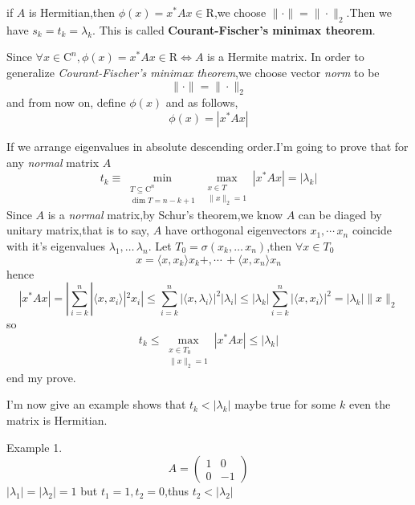 \documentclass[a4paper,12pt]{article}
\begin{document}
if $A$ is Hermitian,then $\phi(x)=x^*Ax \in \mathrm{R}$,we choose $\|\cdot\|=\|\cdot\|_2$.Then we have $s_k = t_k = \lambda_k $. This is called \textbf{Courant-Fischer's minimax theorem}.

Since $\forall x \in \mathrm{C}^n, \phi(x)=x^*Ax \in \mathrm{R} \iff A $ is a Hermite matrix.\newline
In order to generalize \textit{Courant-Fischer's minimax theorem},we choose vector \textit{norm} to be \[ \|\cdot\|=\|\cdot\|_2 \] and from now on, define $\phi(x)$ and as follows,
\[ \phi(x)=|x^*Ax| \]

If we arrange eigenvalues in absolute descending order.I'm going to prove that for any \textit{normal} matrix $A$
\[ t_k \equiv
\min_{\begin{matrix} T \subseteq \mathrm{C}^n \\ \dim T = n-k+1 \end{matrix}} \max_{\begin{matrix} x \in T \\ \|x\|_2=1 \end{matrix} } |x^*Ax| = | \lambda_k | \]
Since $A$ is a \textit{normal} matrix,by Schur's theorem,we know
$A$ can be diaged by unitary matrix,that is to say, $A$ have orthogonal eigenvectors $x_1,\cdots\,x_n$ coincide with it's eigenvalues $\lambda_1,\ldots\,\lambda_n$.\newline
Let $ T_0 = \sigma(x_k,\ldots\,x_n)$,then $\forall x\in T_0$
\[x=\langle x,x_k \rangle x_k+,\cdots\,+ \langle x,x_n \rangle x_n \]
hence
\[ |x^*Ax| = |\sum_{i=k}^n |\langle x,x_i \rangle |^2x_i| \leq \sum_{i=k}^n |\langle x,\lambda_i \rangle |^2|\lambda_i| \leq |\lambda_k| \sum_{i=k}^n |\langle x,x_i \rangle |^2 = |\lambda_k| \|x\|_2 \]
so
\[ t_k \leq \max_{\begin{matrix} x \in T_0 \\ \|x\|_2=1 \end{matrix} } |x^*Ax| \leq |\lambda_k| \]
end my prove.

I'm now give an example shows that $ t_k < |\lambda_k| $ maybe true for some $k$ even the matrix is Hermitian.

Example 1.\newline
\[ A=\left( \begin{matrix} 
1 & 0 \\
0 & -1 \end{matrix} \right) \]
$|\lambda_1|=|\lambda_2|=1 $ but $t_1=1,t_2=0$,thus $ t_2 < |\lambda_2| $
\end{document}
